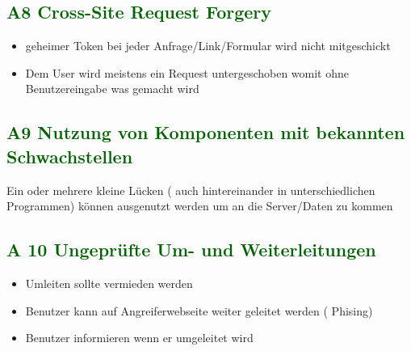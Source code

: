 \subsection*{\textcolor{darkgreen}{A8 Cross-Site Request Forgery}}

\begin{itemize}
	\item geheimer Token bei jeder Anfrage/Link/Formular wird nicht mitgeschickt
	\item Dem User wird meistens ein Request untergeschoben womit ohne Benutzereingabe was gemacht wird
\end{itemize}

\subsection*{\textcolor{darkgreen}{A9 Nutzung von Komponenten mit bekannten Schwachstellen}}

 Ein oder mehrere kleine Lücken ( auch hintereinander in unterschiedlichen Programmen) können ausgenutzt werden um an die Server/Daten zu kommen
 
\subsection*{\textcolor{darkgreen}{A 10 Ungeprüfte Um- und Weiterleitungen}}

\begin{itemize}
	\item Umleiten sollte vermieden werden
	\item Benutzer kann auf Angreiferwebseite weiter geleitet werden ( Phising)
	\item Benutzer informieren wenn er umgeleitet wird
\end{itemize}
